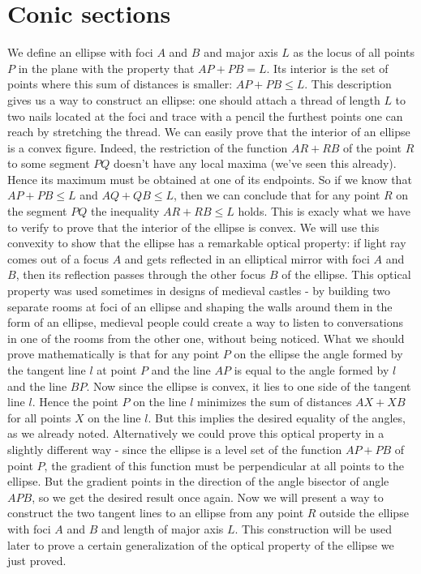 \section{Conic sections}
We define an ellipse with foci $A$ and $B$ and major axis $L$ as the locus of all points $P$ in the plane with the property that $AP+PB=L$. Its interior is the set of points where this sum of distances is smaller: $AP+PB\leq L$. This description gives us a way to construct an ellipse: one should attach a thread of length $L$ to two nails located at the foci and trace with a pencil the furthest points one can reach by stretching the thread.
We can easily prove that the interior of an ellipse is a convex figure. Indeed, the restriction of the function $AR+RB$ of the point $R$ to some segment $PQ$ doesn't have any local maxima (we've seen this already). Hence its maximum must be obtained at one of its endpoints. So if we know that $AP+PB\leq L$ and $AQ+QB\leq L$, then we can conclude that for any point $R$ on the segment $PQ$ the inequality $AR+RB\leq L$ holds. This is exacly what we have to verify to prove that the interior of the ellipse is convex.
We will use this convexity to show that the ellipse has a remarkable optical property: if light ray comes out of a focus $A$ and gets reflected in an elliptical mirror with foci $A$ and $B$, then its reflection passes through the other focus $B$ of the ellipse. This optical property was used sometimes in designs of medieval castles - by building two separate rooms at foci of an ellipse and shaping the walls around them in the form of an ellipse, medieval people could create a way to listen to conversations in one of the rooms from the other one, without being noticed.
What we should prove mathematically is that for any point $P$ on the ellipse the angle formed by the tangent line $l$ at point $P$ and the line $AP$ is equal to the angle formed by $l$ and the line $BP$. Now since the ellipse is convex, it lies to one side of the tangent line $l$. Hence the point $P$ on the line $l$ minimizes the sum of distances $AX+XB$ for all points $X$ on the line $l$. But this implies the desired equality of the angles, as we already noted.
Alternatively we could prove this optical property in a slightly different way - since the ellipse is a level set of the function $AP+PB$ of point $P$, the gradient of this function must be perpendicular at all points to the ellipse. But the gradient points in the direction of the angle bisector of angle $APB$, so we get the desired result once again.
Now we will present a way to construct the two tangent lines to an ellipse from any point $R$ outside the ellipse with foci $A$ and $B$ and length of major axis $L$. This construction will be used later to prove a certain generalization of the optical property of the ellipse we just proved.
